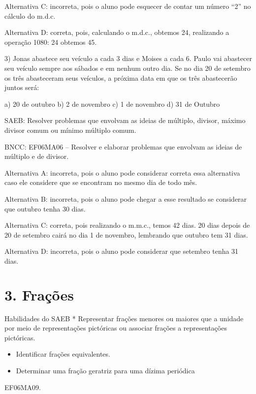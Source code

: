 Alternativa C: incorreta, pois o aluno pode esquecer de contar um número
``2'' no cálculo do m.d.c.

Alternativa D: correta, pois, calculando o m.d.c., obtemos 24,
realizando a operação 1080: 24 obtemos 45.

3) Jonas abastece seu veículo a cada 3 dias e Moises a cada 6. Paulo vai
abastecer seu veículo sempre aos sábados e em nenhum outro dia. Se no
dia 20 de setembro os três abasteceram seus veículos, a próxima data em
que os três abastecerão juntos será:

a) 20 de outubro b) 2 de novembro c) 1 de novembro d) 31 de Outubro

SAEB: Resolver problemas que envolvam as ideias de múltiplo, divisor,
máximo divisor comum ou mínimo múltiplo comum.

BNCC: EF06MA06 -- Resolver e elaborar problemas que envolvam as ideias
de múltiplo e de divisor.

Alternativa A: incorreta, pois o aluno pode considerar correta essa
alternativa caso ele considere que se encontram no mesmo dia de todo
mês.

Alternativa B: incorreta, pois o aluno pode chegar a esse resultado se
considerar que outubro tenha 30 dias.

Alternativa C: correta, pois realizando o m.m.c., temos 42 dias. 20 dias
depois de 20 de setembro cairá no dia 1 de novembro, lembrando que
outubro tem 31 dias.

Alternativa D: incorreta, pois o aluno pode considerar que setembro
tenha 31 dias.

\chapter{3. Frações}

Habilidades do SAEB * Representar frações menores ou maiores que a
unidade por meio de representações pictóricas ou associar frações a
representações pictóricas.

\begin{itemize}
\item
  Identificar frações equivalentes.
\item
  Determinar uma fração geratriz para uma dízima periódica
\end{itemize}


\begin{itemize}
EF06MA09.
\end{itemize}

